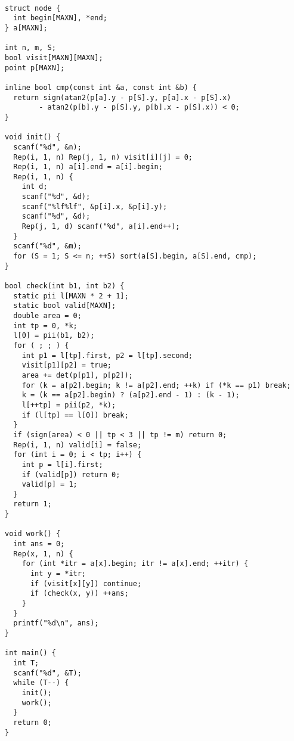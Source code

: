 \begin{lstlisting}

struct node {
  int begin[MAXN], *end;
} a[MAXN];

int n, m, S;
bool visit[MAXN][MAXN];
point p[MAXN];

inline bool cmp(const int &a, const int &b) {
  return sign(atan2(p[a].y - p[S].y, p[a].x - p[S].x)
        - atan2(p[b].y - p[S].y, p[b].x - p[S].x)) < 0;
}

void init() {
  scanf("%d", &n);
  Rep(i, 1, n) Rep(j, 1, n) visit[i][j] = 0;
  Rep(i, 1, n) a[i].end = a[i].begin;
  Rep(i, 1, n) {
    int d;
    scanf("%d", &d);
    scanf("%lf%lf", &p[i].x, &p[i].y);
    scanf("%d", &d);
    Rep(j, 1, d) scanf("%d", a[i].end++);
  }
  scanf("%d", &m);
  for (S = 1; S <= n; ++S) sort(a[S].begin, a[S].end, cmp);
}

bool check(int b1, int b2) {
  static pii l[MAXN * 2 + 1];
  static bool valid[MAXN];
  double area = 0;
  int tp = 0, *k;
  l[0] = pii(b1, b2);
  for ( ; ; ) {
    int p1 = l[tp].first, p2 = l[tp].second;
    visit[p1][p2] = true;
    area += det(p[p1], p[p2]);
    for (k = a[p2].begin; k != a[p2].end; ++k) if (*k == p1) break;
    k = (k == a[p2].begin) ? (a[p2].end - 1) : (k - 1);
    l[++tp] = pii(p2, *k);
    if (l[tp] == l[0]) break;
  }
  if (sign(area) < 0 || tp < 3 || tp != m) return 0;
  Rep(i, 1, n) valid[i] = false;
  for (int i = 0; i < tp; i++) {
    int p = l[i].first;
    if (valid[p]) return 0;
    valid[p] = 1;
  }
  return 1;    
}

void work() {
  int ans = 0;
  Rep(x, 1, n) {
    for (int *itr = a[x].begin; itr != a[x].end; ++itr) {
      int y = *itr;
      if (visit[x][y]) continue;
      if (check(x, y)) ++ans;
    }
  }
  printf("%d\n", ans);      
}

int main() {
  int T;
  scanf("%d", &T);
  while (T--) {
    init();
    work();
  }
  return 0;
}


\end{lstlisting}